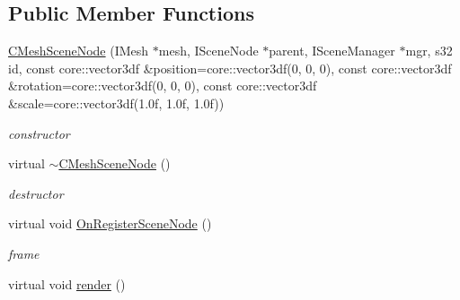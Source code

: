 \subsection*{Public Member Functions}
\begin{DoxyCompactItemize}
\item 
\hypertarget{classirr_1_1scene_1_1_c_mesh_scene_node_a7f9c3313677e540fae7f671d1e08e6fe}{\hyperlink{classirr_1_1scene_1_1_c_mesh_scene_node_a7f9c3313677e540fae7f671d1e08e6fe}{C\-Mesh\-Scene\-Node} (I\-Mesh $\ast$mesh, I\-Scene\-Node $\ast$parent, I\-Scene\-Manager $\ast$mgr, s32 id, const core\-::vector3df \&position=core\-::vector3df(0, 0, 0), const core\-::vector3df \&rotation=core\-::vector3df(0, 0, 0), const core\-::vector3df \&scale=core\-::vector3df(1.\-0f, 1.\-0f, 1.\-0f))}\label{classirr_1_1scene_1_1_c_mesh_scene_node_a7f9c3313677e540fae7f671d1e08e6fe}

\begin{DoxyCompactList}\small\item\em constructor \end{DoxyCompactList}\item 
\hypertarget{classirr_1_1scene_1_1_c_mesh_scene_node_a591fb13c968b153290b92878b43308a6}{virtual \hyperlink{classirr_1_1scene_1_1_c_mesh_scene_node_a591fb13c968b153290b92878b43308a6}{$\sim$\-C\-Mesh\-Scene\-Node} ()}\label{classirr_1_1scene_1_1_c_mesh_scene_node_a591fb13c968b153290b92878b43308a6}

\begin{DoxyCompactList}\small\item\em destructor \end{DoxyCompactList}\item 
\hypertarget{classirr_1_1scene_1_1_c_mesh_scene_node_aa515780daaf7d1420142321aeac425a3}{virtual void \hyperlink{classirr_1_1scene_1_1_c_mesh_scene_node_aa515780daaf7d1420142321aeac425a3}{On\-Register\-Scene\-Node} ()}\label{classirr_1_1scene_1_1_c_mesh_scene_node_aa515780daaf7d1420142321aeac425a3}

\begin{DoxyCompactList}\small\item\em frame \end{DoxyCompactList}\item 
\hypertarget{classirr_1_1scene_1_1_c_mesh_scene_node_a9c9b43a5a23d4f198b371765cf61167e}{virtual void \hyperlink{classirr_1_1scene_1_1_c_mesh_scene_node_a9c9b43a5a23d4f198b371765cf61167e}{render} ()}\label{classirr_1_1scene_1_1_c_mesh_scene_node_a9c9b43a5a23d4f198b371765cf61167e}


\end{DoxyCompactItemize}
